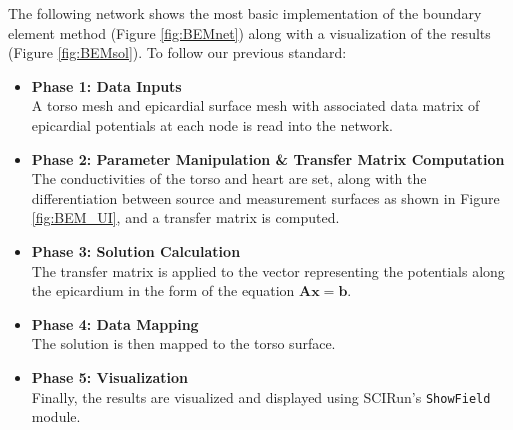 The following network shows the most basic implementation of the boundary element method (Figure \ref{fig:BEMnet})
along with a visualization of the results (Figure \ref{fig:BEMsol}). To follow our previous standard: 
\begin{itemize}
\item {\bf Phase 1: Data Inputs} \\
A torso mesh and epicardial surface mesh with associated data matrix of epicardial potentials at each node is read into the network. 
\item {\bf Phase 2: Parameter Manipulation \& Transfer Matrix Computation} \\
The conductivities of the torso and heart are set, along with the differentiation between source and measurement surfaces as shown in Figure \ref{fig:BEM_UI}, and a transfer matrix is computed. 
\item {\bf Phase 3: Solution Calculation} \\ 
The transfer matrix is applied to the vector representing the potentials along the epicardium in the form of the equation $\mathbf{Ax = b}$.
\item {\bf Phase 4: Data Mapping} \\
The solution is then mapped to the torso surface. 
\item {\bf Phase 5: Visualization} \\
Finally, the results are visualized and displayed using SCIRun's {\tt ShowField} module.
\end{itemize}



\newpage


